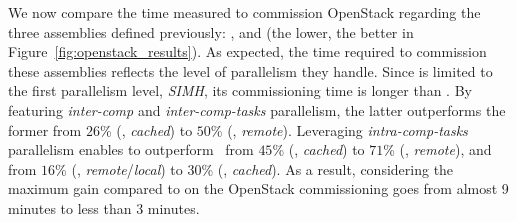 We now compare the time measured to commission OpenStack regarding the
three assemblies defined previously: \ansass, \aeoass and \madass (the
lower, the better in Figure~\ref{fig:openstack_results}).  As
expected, the time required to commission these assemblies reflects
the level of parallelism they handle. Since \ansass is limited to the
first parallelism level, \ie \emph{SIMH}, its commissioning time is
longer than \aeoass. By featuring \emph{inter-comp} and
\emph{inter-comp-tasks} parallelism, the latter outperforms the former
from $26$\% (\nova, \emph{cached}) to $50$\% (\ecotype,
\emph{remote}). Leveraging \emph{intra-comp-tasks} parallelism enables
\madass to outperform \ansass~from $45$\% (\nova, \emph{cached}) to
$71$\% (\ecotype, \emph{remote}), and \aeoass from $16$\% (\nova,
\emph{remote}/\emph{local}) to $30$\% (\ecotype, \emph{cached}). As a
result, considering the maximum gain compared to \ansass on \ecotype
the OpenStack commissioning goes from almost 9 minutes to less than 3
minutes.
%

